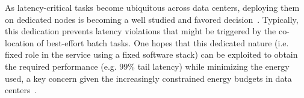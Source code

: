 \label{sec:intro}



As latency-critical tasks become ubiquitous across data centers,
deploying them on dedicated nodes is becoming a well studied and favored decision~\cite{ixcp, heracles, PerAppPower, twine}.
Typically, this dedication prevents latency violations that might be triggered
by the co-location of best-effort batch tasks.
One hopes that this dedicated nature (i.e. fixed role in the service using a fixed software stack) can be exploited to obtain the required performance (e.g. 99\% tail latency) while minimizing the energy used, a key concern given the increasingly constrained energy budgets in data centers~\cite{ixcp, SmoothOperator, Dynamo, oldi-study, oldi-pegasus, NLP-energy}.





